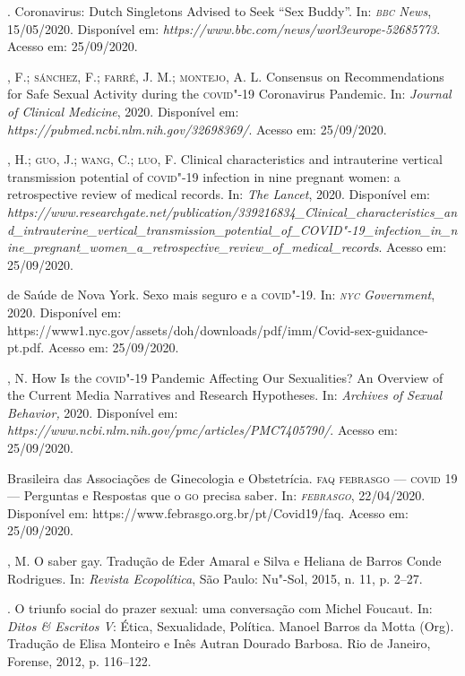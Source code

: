\begin{bibliohedra}
. Coronavirus: Dutch Singletons Advised to Seek ``Sex Buddy''. In:
\emph{\textsc{bbc} News}, 15/05/2020. Disponível em:
\emph{https://www.bbc.com/news/worl3europe-52685773}. Acesso em:
25/09/2020.

, F.; \textsc{sánchez}, F.; \textsc{farré}, J. M.; \textsc{montejo}, A. L. Consensus on
Recommendations for Safe Sexual Activity during the \textsc{covid}"-19 Coronavirus
Pandemic. In: \emph{Journal of Clinical Medicine}, 2020. Disponível em:
\emph{https://pubmed.ncbi.nlm.nih.gov/32698369/}. Acesso em: 25/09/2020.

, H.; \textsc{guo}, J.; \textsc{wang}, C.; \textsc{luo}, F. Clinical characteristics and
intrauterine vertical transmission potential of \textsc{covid}"-19 infection in
nine pregnant women: a retrospective review of medical records. In:
\emph{The Lancet}, 2020. Disponível em:
\emph{https://www.researchgate.net/publication/339216834\_Clinical\_characteristics\_and\_intrauterine\_vertical\_transmission\_potential\_of\_COVID"-19\_infection\_in\_nine\_pregnant\_women\_a\_retrospective\_review\_of\_medical\_records}.
Acesso em: 25/09/2020.

 de Saúde de Nova York. Sexo mais seguro e a \textsc{covid}"-19. In:
\emph{\textsc{nyc} Government}, 2020. Disponível em:
https://www1.nyc.gov/assets/doh/downloads/pdf/imm/Covid-sex-guidance-pt.pdf.
Acesso em: 25/09/2020.

, N. How Is the \textsc{covid}"-19 Pandemic Affecting Our Sexualities? An
Overview of the Current Media Narratives and Research Hypotheses. In:
\emph{Archives of Sexual Behavior,} 2020. Disponível em:
\emph{https://www.ncbi.nlm.nih.gov/pmc/articles/PMC7405790/}. Acesso em:
25/09/2020.

 Brasileira das Associações de Ginecologia e Obstetrícia. \textsc{faq
febrasgo --- covid} 19 --- Perguntas e Respostas que o \textsc{go} precisa saber.
In: \emph{\textsc{febrasgo}}, 22/04/2020. Disponível em:
https://www.febrasgo.org.br/pt/Covid19/faq.
Acesso em: 25/09/2020.

, M. O saber gay. Tradução de Eder Amaral e Silva e Heliana de
Barros Conde Rodrigues. In: \emph{Revista Ecopolítica}, São Paulo:
Nu"-Sol, 2015, n. 11, p. 2--27.

\titidem. O triunfo social do prazer sexual: uma conversação com Michel
Foucaut. In: \emph{Ditos \& Escritos V}: Ética, Sexualidade, Política.
Manoel Barros da Motta (Org). Tradução de Elisa Monteiro e Inês Autran
Dourado Barbosa. Rio de Janeiro, Forense, 2012, p. 116--122.


\end{bibliohedra}
